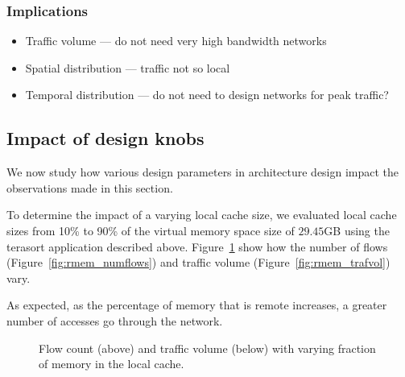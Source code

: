 \subsubsection{Implications}
\label{ssec:implications}

\begin{itemize}[leftmargin=*]
	\itemsep0em
	\item Traffic volume --- do not need very high bandwidth networks
	\item Spatial distribution --- traffic not so local
	\item Temporal distribution --- do not need to design networks for peak traffic?
\end{itemize}		

\subsection{Impact of design knobs}
\label{ssec:knobs}
We now study how various design parameters in \dis architecture design impact the observations made in this section. 


To determine the impact of a varying local cache size, we evaluated local cache sizes from 10\% to 90\% of the virtual memory space size of $29.45$GB using the terasort application described above. Figure~\ref{fig:rmem} show how the number of flows (Figure~\ref{fig:rmem_numflows}) and traffic volume (Figure~\ref{fig:rmem_trafvol}) vary. 

As expected, as the percentage of memory that is remote increases, a greater number of accesses go through the network. 

\begin{figure}[t]
\centering
{}
\caption{Flow count (above) and traffic volume (below) with varying fraction of memory in the local cache.}
\label{fig:rmem}
\end{figure}


